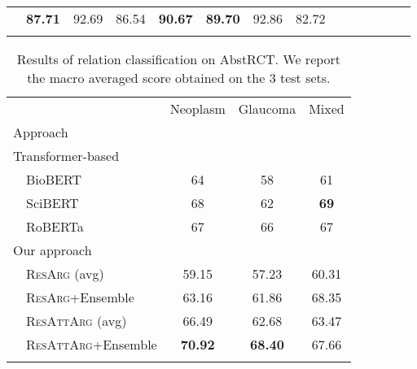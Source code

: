 \documentclass[journal]{IEEEtran}
\begin{document}
\begin{table*}[t]
\begin{tabular}{l l cccc cccc cccc}
	&	\textbf{87.71}	&	92.69	&	86.54	& \textbf{90.67}

	&	\textbf{89.70}	&	92.86	&	82.72	\\

\noalign{\smallskip}
 \hline
 \end{tabular}
\end{table*}



\begin{table}[t]
\centering
 \caption[Results of relation classification on AbstRCT.]{Results of relation classification on AbstRCT. We report the macro averaged  score obtained on the 3 test sets.}
 \label{table:resnets_resultsRCTRC}
 \begin{tabular}{ l c c c}
 \noalign{\smallskip}
 \hline
 \noalign{\smallskip}
 	& Neoplasm & Glaucoma  & Mixed \\
 	Approach    &   &  & \\
 \noalign{\smallskip}
 \hline
 \noalign{\smallskip}	
 Transformer-based~\cite{DBLP:conf/ecai/0002CV20}    &	&		& \\
~~BioBERT	&	64	&	58	&	61	\\
~~SciBERT	&	68	&	62	&	\textbf{69}	\\
~~RoBERTa	&	67	&	66	&	67	\\
\noalign{\smallskip}
Our approach	\\
~~\textsc{ResArg} (avg) & 59.15 & 57.23 & 60.31 \\
~~\textsc{ResArg}+Ensemble & 63.16 & 61.86 & 68.35\\
~~\textsc{ResAttArg} (avg) & 66.49 & 62.68 & 63.47 \\
~~\textsc{ResAttArg}+Ensemble	&	\textbf{70.92}	&	\textbf{68.40}   &	67.66	\\

\noalign{\smallskip}
 \hline
 \end{tabular}
\end{table}
\end{document}
